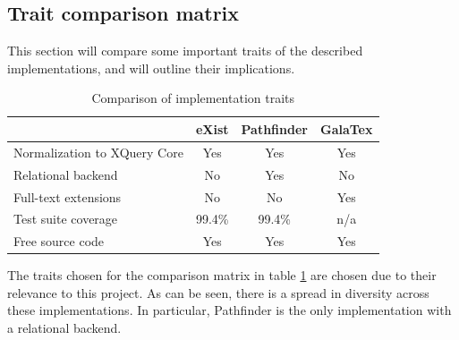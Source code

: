 \subsection{Trait comparison matrix}
\label{sect:theory:existing_implementations:comparison}
This section will compare some important traits of the described
implementations, and will outline their implications.
\begin{table}[!h]
	\centering
	\begin{tabular}{ | p{3cm} | c | c | c |}
	\hline
	& eXist & Pathfinder & GalaTex \\ \hline
	Normalization to XQuery Core & Yes & Yes & Yes \\ \hline
	Relational backend & No & Yes & No \\ \hline
	Full-text extensions & No & No & Yes \\ \hline
	Test suite coverage & 99.4\% & 99.4\% & n/a \\ \hline
	Free source code & Yes & Yes & Yes  \\
	\hline
	\end{tabular}
	\caption{Comparison of implementation traits}
	\label{figure:comparison_matrix}
\end{table}
The traits chosen for the comparison matrix in table
\ref{figure:comparison_matrix} are chosen due to their relevance to this
project. As can be seen, there is a spread in diversity across these
implementations. In particular, Pathfinder is the only implementation with a
relational backend.